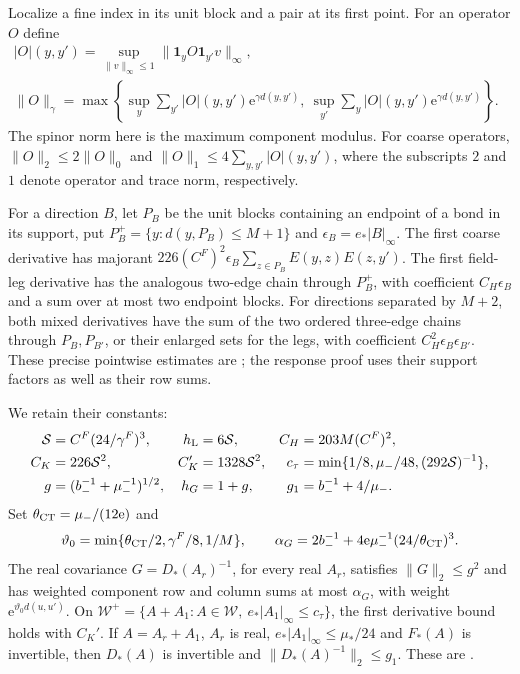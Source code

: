 \documentclass[11pt,letterpaper,reqno]{amsart}
\begin{document}
Localize a fine index in its unit block and a pair at its first
point. For an operator $O$ define
\begin{align*}
 |O|(y,y')=\sup_{\|v\|_\infty\le1}
                       \|\mathbf1_yO\mathbf1_{y'}v\|_\infty,\qquad&\\
 \|O\|_\gamma=\max\left\{
 \sup_y\sum_{y'}|O|(y,y')\mathrm e^{\gamma d(y,y')},\
 \sup_{y'}\sum_y|O|(y,y')\mathrm e^{\gamma d(y,y')}\right\}.&
\end{align*}
The spinor norm here is the maximum component modulus.
For coarse operators, $\|O\|_2\le2\|O\|_0$ and
$\|O\|_1\le4\sum_{y,y'}|O|(y,y')$, where the subscripts
$2$ and $1$ denote operator and trace norm, respectively.

For a direction $B$, let $P_B$ be the unit blocks containing
an endpoint of a bond in its support, put
$P_B^+=\{y:d(y,P_B)\le M+1\}$ and
$\epsilon_B=e_*|B|_\infty$.
The first coarse derivative has majorant
$226(C^F)^2\epsilon_B\sum_{z\in P_B}E(y,z)E(z,y')$.
The first field-leg derivative has the analogous two-edge chain
through $P_B^+$, with coefficient $C_H\epsilon_B$ and a sum
over at most two endpoint blocks. For directions separated by
$M+2$, both mixed derivatives have the sum of the two ordered
three-edge chains through $P_B,P_{B'}$, or their enlarged sets
for the legs, with coefficient $C_H^2\epsilon_B\epsilon_{B'}$.
These precise pointwise estimates are
\cite[Proposition~A.1]{TerminalPressure}; the response proof uses
their support factors as well as their row sums.

We retain their constants:
\begin{align*}
 \mathcal S&=C^F(24/\gamma^F)^3,&
 h_{\rm L}&=6\mathcal S,& C_H&=203M(C^F)^2,\\
 C_K&=226\mathcal S^2,& C_K'&=1328\mathcal S^2,&
 c_\tau&=\min\{1/8,\mu_-/48,(292\mathcal S)^{-1}\},\\
 g&=(b_-^{-1}+\mu_-^{-1})^{1/2},&h_G&=1+g,&g_1&=b_-^{-1}+4/\mu_-.
\end{align*}
Set $\theta_{\rm CT}=\mu_-/(12\mathrm e)$ and
\[
 \vartheta_0=\min\{\theta_{\rm CT}/2,\gamma^F/8,1/M\},\qquad
 \alpha_G=2b_-^{-1}
           +4\mathrm e\mu_-^{-1}(24/\theta_{\rm CT})^3.
\]
The real covariance $G=D_*(A_r)^{-1}$, for every real $A_r$,
satisfies $\|G\|_2\le g^2$ and has weighted component row and
column sums at most $\alpha_G$, with weight
$\mathrm e^{\vartheta_0d(u,u')}$.
On $\mathcal W^+=\{A+A_1:A\in\mathcal W,\ e_*|A_1|_\infty\le c_\tau\}$,
the first derivative bound holds with $C_K'$.
If $A=A_r+A_1$, $A_r$ is real, $e_*|A_1|_\infty\le\mu_*/24$
and $F_*(A)$ is invertible, then $D_*(A)$ is invertible and
$\|D_*(A)^{-1}\|_2\le g_1$.
These are \cite[(72)--(75)]{TerminalPressure}.
\end{document}
